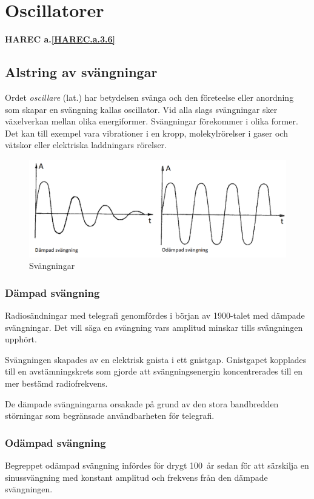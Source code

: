 \section{Oscillatorer}
\textbf{HAREC a.\ref{HAREC.a.3.6}\label{myHAREC.a.3.6}}
\label{oscillatorer}

\subsection{Alstring av svängningar}
Ordet \emph{oscillare} (lat.) har betydelsen svänga och den företeelse
eller anordning som skapar en svängning kallas oscillator.
Vid alla slags svängningar sker växelverkan mellan olika energiformer.
Svängningar förekommer i olika former.
Det kan till exempel vara vibrationer i en kropp, molekylrörelser i gaser och
vätskor eller elektriska laddningars rörelser.

\begin{figure}
\includegraphics[width=\textwidth]{images/cropped_pdfs/bild_2_3-63.pdf}
\caption{Svängningar}
\label{fig:BildII3-63}
\end{figure}

\subsubsection{Dämpad svängning}
Radiosändningar med telegrafi genomfördes i början av 1900-talet med dämpade
svängningar.
Det vill säga en svängning vars amplitud minskar tills svängningen upphört.

Svängningen skapades av en elektrisk gnista i ett gnistgap.
Gnistgapet kopplades till en avstämningskrets som gjorde att svängningsenergin
koncentrerades till en mer bestämd radiofrekvens.

De dämpade svängningarna orsakade på grund av den stora bandbredden störningar
som begränsade användbarheten för telegrafi.

\subsubsection{Odämpad svängning}
Begreppet odämpad svängning infördes för drygt 100~år sedan för att särskilja
en sinussvängning med konstant amplitud och frekvens från den dämpade
svängningen.

